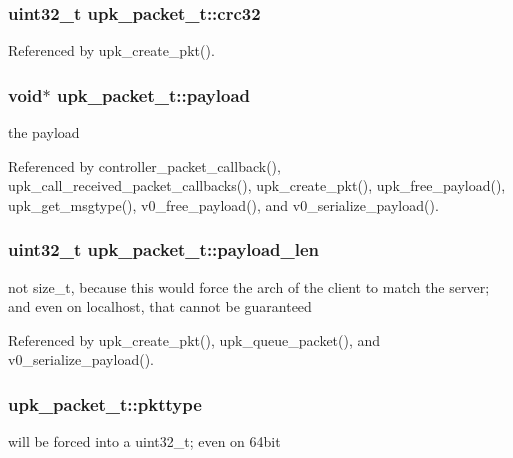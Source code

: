 \subsubsection[{crc32}]{\setlength{\rightskip}{0pt plus 5cm}uint32\_\-t {\bf upk\_\-packet\_\-t::crc32}}\label{structupk__packet__t_a440fa8d8947e7f5c17997d51f12d4cee}


Referenced by upk\_\-create\_\-pkt().

\subsubsection[{payload}]{\setlength{\rightskip}{0pt plus 5cm}void$\ast$ {\bf upk\_\-packet\_\-t::payload}}\label{structupk__packet__t_aeae9f273821e5bb68fd6957cbde86a14}
the payload 

Referenced by controller\_\-packet\_\-callback(), upk\_\-call\_\-received\_\-packet\_\-callbacks(), upk\_\-create\_\-pkt(), upk\_\-free\_\-payload(), upk\_\-get\_\-msgtype(), v0\_\-free\_\-payload(), and v0\_\-serialize\_\-payload().

\subsubsection[{payload\_\-len}]{\setlength{\rightskip}{0pt plus 5cm}uint32\_\-t {\bf upk\_\-packet\_\-t::payload\_\-len}}\label{structupk__packet__t_a4763ca6853e27fe3eb7e2b3ec45deeb5}
not size\_\-t, because this would force the arch of the client to match the server; and even on localhost, that cannot be guaranteed 

Referenced by upk\_\-create\_\-pkt(), upk\_\-queue\_\-packet(), and v0\_\-serialize\_\-payload().

\subsubsection[{pkttype}]{ {\bf upk\_\-packet\_\-t::pkttype}}\label{structupk__packet__t_a90897befc1fe65ebb2c18748a5881d83}
will be forced into a uint32\_\-t; even on 64bit 

